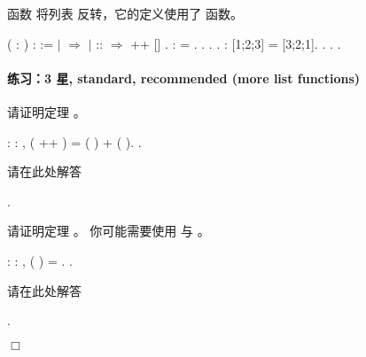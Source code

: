 \documentclass[12pt]{report}
\begin{document}
{{{ 函数  将列表  反转，它的定义使用了  函数。\begin{coqdoccode}
\coqdocemptyline
\coqdocnoindent
{}  ( : ) :  :=\coqdoceol
\coqdocindent{1.00em}
  \coqdoceol
\coqdocindent{1.00em}
\ensuremath{|}     \ensuremath{\Rightarrow} \coqdoceol
\coqdocindent{1.00em}
\ensuremath{|}  ::  \ensuremath{\Rightarrow}   ++ []\coqdoceol
\coqdocindent{1.00em}
.\coqdoceol
\coqdocemptyline
\coqdocnoindent
{} :   = .\coqdoceol
\coqdocnoindent
{}. . .\coqdoceol
\coqdocemptyline
\coqdocnoindent
{} :  [1;2;3] = [3;2;1].\coqdoceol
\coqdocnoindent
{}. . .\coqdoceol
\end{coqdoccode}
\paragraph{练习：3 星, standard, recommended (more list functions)}



  请证明定理 。
\begin{coqdoccode}
\coqdocnoindent
{}  : \coqdockw{\ensuremath{\forall}}   : ,\coqdoceol
\coqdocindent{1.00em}
 ( ++ ) = ( ) + ( ).\coqdoceol
\coqdocnoindent
{}.\coqdoceol
\end{coqdoccode}
请在此处解答 \begin{coqdoccode}
\coqdocnoindent
{}.\coqdoceol
\coqdocemptyline
\end{coqdoccode}
  请证明定理 。
  你可能需要使用  与 。
\begin{coqdoccode}
\coqdocnoindent
{}  : \coqdockw{\ensuremath{\forall}}  : ,\coqdoceol
\coqdocindent{1.00em}
 ( ) =  .\coqdoceol
\coqdocnoindent
{}.\coqdoceol
\end{coqdoccode}
请在此处解答 \begin{coqdoccode}
\coqdocnoindent
{}.\coqdoceol
\end{coqdoccode}
\ensuremath{\Box} \begin{coqdoccode}
\end{coqdoccode}
}}}
\end{document}

